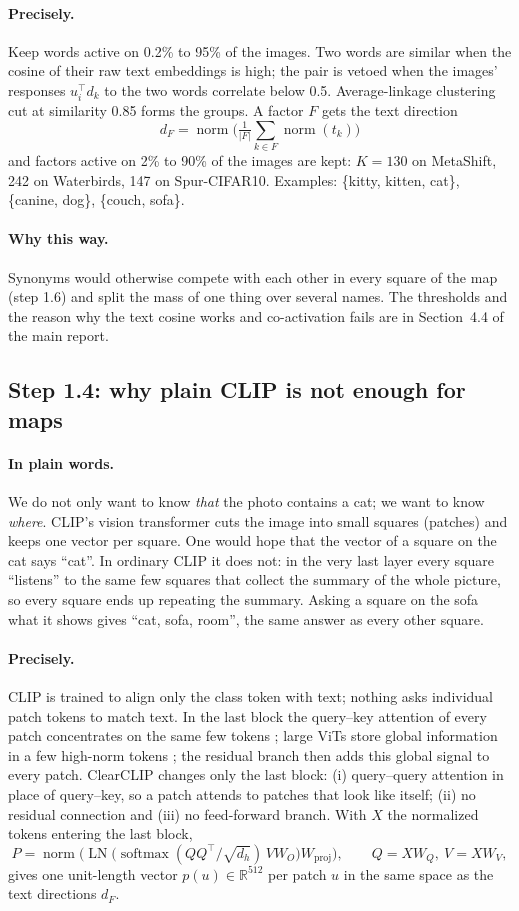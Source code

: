 \documentclass[11pt]{article}
\newcommand{\plain}{\paragraph{In plain words.}}
\newcommand{\precise}{\paragraph{Precisely.}}
\newcommand{\why}{\paragraph{Why this way.}}
\begin{document}
\precise Keep words active on 0.2\% to 95\% of the images. Two words are similar when the cosine of their raw
text embeddings is high; the pair is vetoed when the images' responses $u_i^\top d_k$ to the two words correlate
below 0.5. Average-linkage clustering cut at similarity 0.85 forms the groups. A factor $F$ gets the text direction
\begin{equation}
d_F=\operatorname{norm}\Big(\tfrac{1}{|F|}\textstyle\sum_{k\in F}\operatorname{norm}(t_k)\Big)
\end{equation}
and factors active on 2\% to 90\% of the images are kept: $K=130$ on MetaShift, 242 on Waterbirds, 147 on
Spur-CIFAR10. Examples: \{kitty, kitten, cat\}, \{canine, dog\}, \{couch, sofa\}.

\why Synonyms would otherwise compete with each other in every square of the map (step 1.6) and split the mass
of one thing over several names. The thresholds and the reason why the text cosine works and co-activation fails
are in Section~4.4 of the main report.

\subsection{Step 1.4: why plain CLIP is not enough for maps}
\plain We do not only want to know \emph{that} the photo contains a cat; we want to know \emph{where}. CLIP's vision
transformer cuts the image into small squares (patches) and keeps one vector per square. One would hope that the
vector of a square on the cat says ``cat''. In ordinary CLIP it does not: in the very last layer every square
``listens'' to the same few squares that collect the summary of the whole picture, so every square ends up
repeating the summary. Asking a square on the sofa what it shows gives ``cat, sofa, room'', the same answer as
every other square.

\precise CLIP is trained to align only the class token with text; nothing asks individual patch tokens to match
text. In the last block the query--key attention of every patch concentrates on the same few tokens
\citep{zhou2022maskclip,wang2024sclip}; large ViTs store global information in a few high-norm tokens
\citep{darcet2024registers}; the residual branch then adds this global signal to every patch. ClearCLIP
\citep{lan2024clearclip} changes only the last block: (i) query--query attention in place of query--key, so a patch
attends to patches that look like itself; (ii) no residual connection and (iii) no feed-forward branch. With $X$
the normalized tokens entering the last block,
\begin{equation}
P=\operatorname{norm}\Big(\operatorname{LN}\big(\operatorname{softmax}(QQ^\top/\sqrt{d_h})\,V W_O\big)W_{\text{proj}}\Big),
\qquad Q=XW_Q,\ V=XW_V,
\end{equation}
gives one unit-length vector $p(u)\in\mathbb R^{512}$ per patch $u$ in the same space as the text directions $d_F$.
\end{document}
